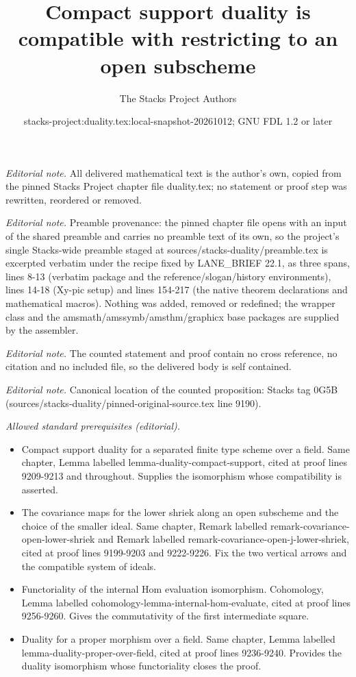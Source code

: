 \documentclass[10pt,a4paper]{amsart}
\title{Compact support duality is compatible with restricting to an open subscheme}
\author{The Stacks Project Authors}
\date{stacks-project:duality.tex:local-snapshot-20261012; GNU FDL 1.2 or later}
\theoremstyle{plain}
\theoremstyle{definition}
\theoremstyle{remark}
\numberwithin{equation}{subsection}
\begin{document}
\maketitle
\noindent\textit{Editorial note.} All delivered mathematical text is the author's own, copied from the pinned Stacks Project chapter file duality.tex; no statement or proof step was rewritten, reordered or removed.\par\medskip
\noindent\textit{Editorial note.} Preamble provenance: the pinned chapter file opens with an input of the shared preamble and carries no preamble text of its own, so the project's single Stacks-wide preamble staged at sources/stacks-duality/preamble.tex is excerpted verbatim under the recipe fixed by LANE\_BRIEF 22.1, as three spans, lines 8-13 (verbatim package and the reference/slogan/history environments), lines 14-18 (Xy-pic setup) and lines 154-217 (the native theorem declarations and mathematical macros). Nothing was added, removed or redefined; the wrapper class and the amsmath/amssymb/amsthm/graphicx base packages are supplied by the assembler.\par\medskip
\noindent\textit{Editorial note.} The counted statement and proof contain no cross reference, no citation and no included file, so the delivered body is self contained.\par\medskip
\noindent\textit{Editorial note.} Canonical location of the counted proposition: Stacks tag 0G5B (sources/stacks-duality/pinned-original-source.tex line 9190).\par\medskip
\noindent\textit{Allowed standard prerequisites (editorial).}\begin{itemize}
\item Compact support duality for a separated finite type scheme over a field. Same chapter, Lemma labelled lemma-duality-compact-support, cited at proof lines 9209-9213 and throughout. Supplies the isomorphism whose compatibility is asserted.
\item The covariance maps for the lower shriek along an open subscheme and the choice of the smaller ideal. Same chapter, Remark labelled remark-covariance-open-lower-shriek and Remark labelled remark-covariance-open-j-lower-shriek, cited at proof lines 9199-9203 and 9222-9226. Fix the two vertical arrows and the compatible system of ideals.
\item Functoriality of the internal Hom evaluation isomorphism. Cohomology, Lemma labelled cohomology-lemma-internal-hom-evaluate, cited at proof lines 9256-9260. Gives the commutativity of the first intermediate square.
\item Duality for a proper morphism over a field. Same chapter, Lemma labelled lemma-duality-proper-over-field, cited at proof lines 9236-9240. Provides the duality isomorphism whose functoriality closes the proof.
\end{itemize}\medskip
\end{document}
